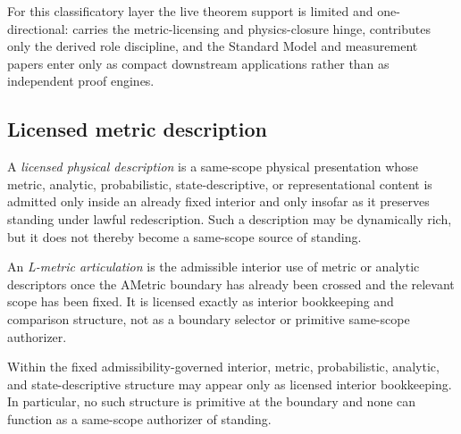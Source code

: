 For this classificatory layer the live theorem support is limited and one-directional: \clausuradoc{} carries the metric-licensing and physics-closure hinge, \atsdoc{} contributes only the derived role discipline, and the Standard Model and measurement papers enter only as compact downstream applications rather than as independent proof engines.\cite{MaleyClausura,MaleyATS,MaleyStructura,MaleyMeasurement}

\subsection{Licensed metric description}

\begin{definition}
A \emph{licensed physical description} is a same-scope physical presentation whose metric, analytic, probabilistic, state-descriptive, or representational content is admitted only inside an already fixed interior and only insofar as it preserves standing under lawful redescription. Such a description may be dynamically rich, but it does not thereby become a same-scope source of standing.
\end{definition}

\begin{definition}
An \emph{L-metric articulation} is the admissible interior use of metric or analytic descriptors once the AMetric boundary has already been crossed and the relevant scope has been fixed. It is licensed exactly as interior bookkeeping and comparison structure, not as a boundary selector or primitive same-scope authorizer.
\end{definition}

\begin{theorem}
\label{thm:licensed-metric-description}
Within the fixed admissibility-governed interior, metric, probabilistic, analytic, and state-descriptive structure may appear only as licensed interior bookkeeping. In particular, no such structure is primitive at the boundary and none can function as a same-scope authorizer of standing.
\end{theorem}

